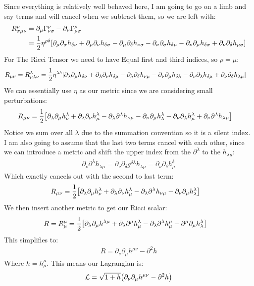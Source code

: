 \documentclass[12pt]{article}
\renewcommand{\L}{\mathcal{L}}
\newcommand{\D}{\partial}
\newcommand{\munu}{{\mu\nu}}
\newcommand*{\circd}[1]{\tikz[baseline=(char.base)]{
    \node[shape=circle,draw,inner sep=2pt] (char) {#1};}}
\begin{document}
Since everything is relatively well behaved here, I am going to go on a limb and say terms \circd3 and \circd4 will cancel when we subtract them, so we are left with:
\begin{align*}
  R^\rho_{\sigma\munu}&=\D_\mu\Gamma^\rho_{\nu\sigma}-\D_\nu\Gamma^\rho_{\mu\sigma}\\
  &=\frac{1}{2}\eta^{\rho\delta}\qty[
  \D_\mu\D_\sigma h_{\delta\nu}+\D_\mu\D_\nu h_{\delta\sigma}
  -\D_\mu\D_\delta h_{\nu\sigma}
  -\D_\nu\D_\sigma h_{\delta\mu}-\D_\nu\D_\mu h_{\delta\sigma}
  +\D_\nu\D_\delta h_{\mu\sigma}]
\end{align*}
For The Ricci Tensor we need to have Equal first and third indices, so $\rho=\mu$:
\begin{align*}
  R_\munu=R^\lambda_{\mu\lambda\nu}&=\frac{1}{2}\eta^{\lambda\delta}\qty[
  \D_\lambda\D_\mu h_{\delta\nu}+\D_\lambda\D_\nu h_{\delta\mu}
  -\D_\lambda\D_\delta h_{\nu\mu}
  -\D_\nu\D_\mu h_{\delta\lambda}-\D_\nu\D_\lambda h_{\delta\mu}
  +\D_\nu\D_\delta h_{\lambda\mu}]
\end{align*}
We can essentially use $\eta$ as our metric since we are considering small perturbations:
\begin{align*}
  R_\munu&=\frac{1}{2}\qty[
  \D_\lambda\D_\mu h^\lambda_\nu+
  \D_\lambda\D_\nu h^\lambda_\mu-
  \D_\lambda\D^\lambda h_{\nu\mu}-
  \D_\nu\D_\mu h^\lambda_\lambda-
  \D_\nu\D_\lambda h^\lambda_\mu+
  \D_\nu\D^\lambda h_{\lambda\mu}]
\end{align*}
Notice we sum over all $\lambda$ due to the summation convention so it is a silent index. I am also going to assume that the last two terms cancel with each other, since we can introduce a metric and shift the upper index from the $\D^\lambda$ to the $h_{\lambda\mu}$:
\begin{align*}
  \D_\nu\D^\lambda h_{\lambda\mu}=\D_\nu\D_\delta g^{\delta\lambda}h_{\lambda\mu}
  =\D_\nu\D_\delta h^\delta_\mu
\end{align*}
Which exactly cancels out with the second to last term:
\begin{align*}
  R_\munu&=\frac{1}{2}\qty[
  \D_\lambda\D_\mu h^\lambda_\nu+
  \D_\lambda\D_\nu h^\lambda_\mu-
  \D_\lambda\D^\lambda h_{\nu\mu}-
  \D_\nu\D_\mu h^\lambda_\lambda]
\end{align*}
We then insert another metric to get our Ricci scalar:
\begin{align*}
  R=R^\mu_\mu&=\frac{1}{2}\qty[
  \D_\lambda\D_\mu h^{\lambda\mu}+
  \D_\lambda\D^\mu h^\lambda_\mu-
  \D_\lambda\D^\lambda h^\mu_{\mu}-
  \D^\mu\D_\mu h^\lambda_\lambda]
\end{align*}
This simplifies to:
\begin{align*}
  R=\D_\nu\D_\mu h^\munu-\D^2h
\end{align*}
Where $h=h^\mu_\mu$. This means our Lagrangian is:
\begin{align*}
  \L=\sqrt{1+h}\qty(\D_\nu\D_\mu h^\munu-\D^2h)
\end{align*}
\end{document}
